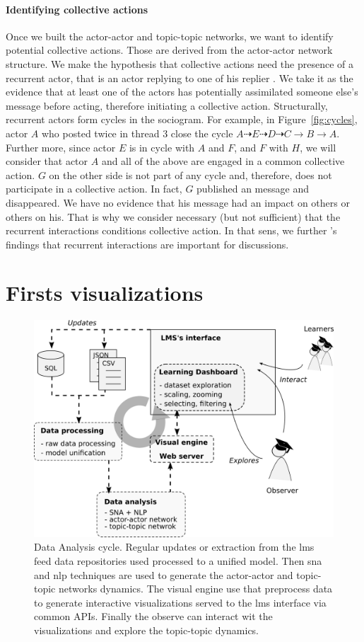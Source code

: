 \documentclass[a4paper,twoside]{article}
\begin{document}
\paragraph{Identifying collective actions}

Once we built the actor-actor and topic-topic networks,  we want to identify potential collective actions.  Those are derived from the actor-actor network structure.
We make the hypothesis that collective actions need the presence of a recurrent actor, that is an actor replying to one of his replier \citep{Chua2017}.  We take it as the evidence that at least one of the actors has potentially assimilated someone else's message before acting, therefore initiating a collective action.
Structurally, recurrent actors form cycles in the sociogram.  For example, in Figure~\ref{fig:cycles}, actor $A$ who posted twice in thread 3 close the cycle $A \dashrightarrow E  \dashrightarrow  D  \dashrightarrow C \to B \to A$.  Further more, since actor $E$ is in cycle with $A$ and $F$, and $F$ with $H$, we will consider that actor $A$ and all of the above are engaged in a common collective action.  $G$ on the other side is not part of any cycle and, therefore, does not participate in a collective action.  In fact, $G$ published an message and disappeared.  We have no evidence that his message had an impact on others or others on his.  That is why we consider necessary (but not sufficient) that the recurrent interactions conditions collective action.   In that sens, we further \cite{Chua2017}'s findings that recurrent interactions are important for discussions.

\section{Firsts visualizations}
\label{section:5}

\begin{figure}[t]
  \includegraphics[width=.5\textwidth]{images/pipeline.png}
  \small{
    \caption{\label{fig:pipeline} Data Analysis cycle. Regular updates or extraction from the \gls{lms} feed data repositories used processed to a unified model.  Then \gls{sna} and \gls{nlp} techniques are used to generate the actor-actor and topic-topic networks dynamics.  The visual engine use that preprocess data to generate interactive visualizations served to the \gls{lms} interface via common APIs.  Finally the observe can interact wit the visualizations and explore the topic-topic dynamics.
    }}
\end{figure}
\end{document}
